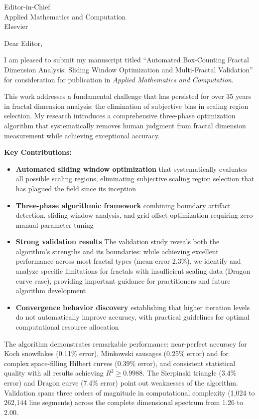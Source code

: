 \documentclass[11pt]{letter}
\begin{document}
\begin{letter}{Editor-in-Chief\\
Applied Mathematics and Computation\\
Elsevier}

\opening{Dear Editor,}

I am pleased to submit my manuscript titled ``Automated Box-Counting Fractal Dimension Analysis: Sliding Window Optimization and Multi-Fractal Validation'' for consideration for publication in \emph{Applied Mathematics and Computation}.

This work addresses a fundamental challenge that has persisted for over 35 years in fractal dimension analysis: the elimination of subjective bias in scaling region selection. My research introduces a comprehensive three-phase optimization algorithm that systematically removes human judgment from fractal dimension measurement while achieving exceptional accuracy.

\textbf{Key Contributions:}
\begin{itemize}
\item \textbf{Automated sliding window optimization} that systematically evaluates all possible scaling regions, eliminating subjective scaling region selection that has plagued the field since its inception
\item \textbf{Three-phase algorithmic framework} combining boundary artifact detection, sliding window analysis, and grid offset optimization requiring zero manual parameter tuning
\item \textbf{Strong validation results} The validation study reveals both the algorithm's strengths and its boundaries: while achieving excellent performance across most fractal types (mean error 2.3\%), we identify and analyze specific limitations for fractals with insufficient scaling data (Dragon curve case), providing important guidance for practitioners and future algorithm development
\item \textbf{Convergence behavior discovery} establishing that higher iteration levels do not automatically improve accuracy, with practical guidelines for optimal computational resource allocation
\end{itemize}

The algorithm demonstrates remarkable performance: near-perfect accuracy for Koch snowflakes (0.11\% error), Minkowski sausages (0.25\% error) and for complex space-filling Hilbert curves (0.39\% error), and consistent statistical quality with all results achieving $R^2 \geq 0.9988$. The Sierpinski triangle (3.4\% error) and Dragon curve (7.4\% error) point out weaknesses of the algorithm.  Validation spans three orders of magnitude in computational complexity (1,024 to 262,144 line segments) across the complete dimensional spectrum from 1.26 to 2.00.


\end{letter}
\end{document}
